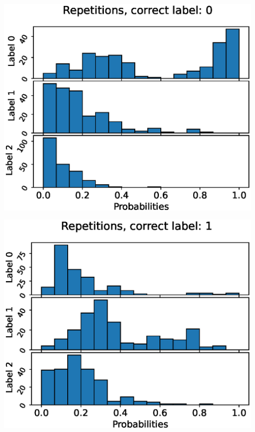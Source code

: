 \begin{center}
\begin{minipage}{0.33\textwidth}
  \includegraphics[width=\textwidth]{files/figs/app/hists/pelvis/r0.eps}
\end{minipage}%
\begin{minipage}{0.33\textwidth}
  \includegraphics[width=\textwidth]{files/figs/app/hists/pelvis/r1.eps}
\end{minipage}%
\begin{minipage}{0.33\textwidth}

\end{minipage}
\end{center}
